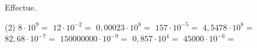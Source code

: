 %
%
Effectue.
	\begin{tasks} (2)
		\task $8\cdot 10^9=$
		\task $12\cdot 10^{-2}=$
		\task $0,00023\cdot 10^8=$
		\task $157\cdot 10^{-5}=$
		\task $4,5478\cdot 10^8=$
		\task $82,68\cdot 10^{-7}=$
		\task $150000000\cdot 10^{-9}=$
		\task $0,857\cdot 10^4=$
		\task $45000\cdot 10^{-6}=$
	\end{tasks}
